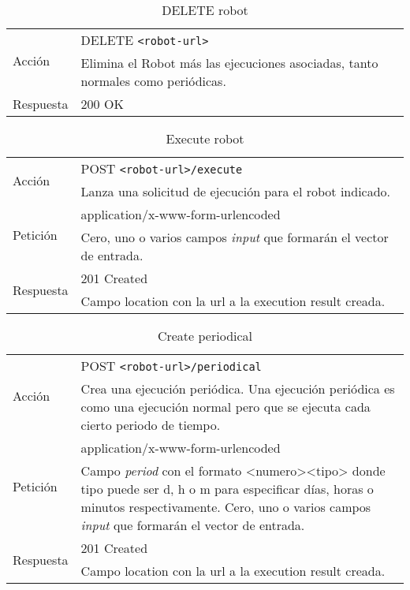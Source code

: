 \begin{table}
\begin{tabularx}{\textwidth}{l X}
\multirow{2}{*}{Acción}
 & DELETE \verb+<robot-url>+ \\
 & Elimina el Robot más las ejecuciones asociadas, tanto normales como
periódicas.\\ \hline
\multirow{1}{*}{Respuesta}
& 200 OK \\
\end{tabularx}
\caption{DELETE robot}
\label{delete_robot}
\end{table}

\begin{table}
\begin{tabularx}{\textwidth}{l X}
\multirow{2}{*}{Acción}
 & POST \verb+<robot-url>/execute+ \\
 & Lanza una solicitud de ejecución para el robot indicado.\\ \hline
\multirow{2}{*}{Petición}
 & application/x-www-form-urlencoded \\
 & Cero, uno o varios campos \emph{input} que formarán el vector de entrada.\\ \hline
\multirow{2}{*}{Respuesta}
& 201 Created \\
& Campo location con la url a la execution result creada.\\
\end{tabularx}
\caption{Execute robot}
\label{execute_robot}
\end{table}

\begin{table}
\begin{tabularx}{\textwidth}{l X}
\multirow{2}{*}{Acción}
 & POST \verb+<robot-url>/periodical+ \\
 & Crea una ejecución periódica. Una ejecución periódica es como una
ejecución normal pero que se ejecuta cada cierto periodo de tiempo.\\ \hline
\multirow{2}{*}{Petición}
 & application/x-www-form-urlencoded \\
 & Campo \emph{period} con el formato <numero><tipo> donde tipo puede
ser d, h o m para especificar días, horas o minutos respectivamente.\newline
 Cero, uno o varios campos \emph{input} que formarán el vector de entrada.\\ \hline
\multirow{2}{*}{Respuesta}
& 201 Created \\
& Campo location con la url a la execution result creada.\\ \hline
\end{tabularx}
\caption{Create periodical}
\label{create_periodical}
\end{table}
\newpage

